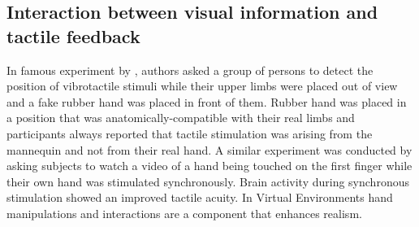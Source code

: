 \documentclass{vgtc}
\begin{document}
\subsection{Interaction between visual information and tactile feedback}
In famous experiment by \cite{Pavani2000}, authors asked a group of persons to detect the position of vibrotactile stimuli while their upper limbs were placed out of view and a fake rubber hand was placed in front of them. Rubber hand was placed in a position that was anatomically-compatible with their real limbs and participants always reported that tactile stimulation was arising from the mannequin and not from their real hand. A similar experiment was conducted by \cite{Schaefer2006} asking subjects to watch a video of a hand being touched on the first finger while their own hand was stimulated synchronously. Brain activity during synchronous stimulation showed an improved tactile acuity.  In Virtual Environments hand manipulations and interactions are a component that enhances realism. 
\end{document}
